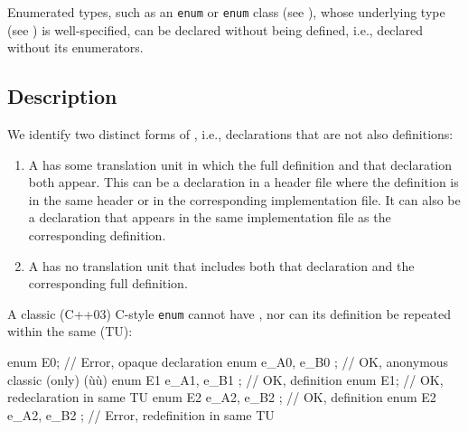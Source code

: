 


\label{opaque-enumeration-declarations}
\setcounter{table}{0}
\setcounter{footnote}{0}
\setcounter{lstlisting}{0}


Enumerated types, such as an \lstinline!enum! or \lstinline!enum! class (see ), whose underlying type (see ) is well-specified, can be
declared without being defined, i.e., declared without its enumerators.

\subsection[Description]{Description}\label{description}

We identify two distinct forms of , i.e.,
declarations that are not also definitions:
\begin{enumerate}
\item{A  has some translation unit in which the full definition and that declaration both appear. This can be a declaration in a header file where the definition is in the same header or in the corresponding implementation file. It can also be a declaration that appears in the same implementation file as the corresponding definition.}
\item{A  has no translation unit that includes both that declaration and the corresponding full definition.}
\end{enumerate}

A classic (C++03) C-style \lstinline!enum! cannot have , nor can its definition be repeated within the same
 (TU):

\begin{emcppslisting}
enum E0;                 // Error, opaque declaration
enum    { e_A0, e_B0 };  // OK, anonymous classic (only) (ù{}ù)
enum E1 { e_A1, e_B1 };  // OK, definition
enum E1;                 // OK, redeclaration in same TU
enum E2 { e_A2, e_B2 };  // OK, definition
enum E2 { e_A2, e_B2 };  // Error, redefinition in same TU
\end{emcppslisting}

